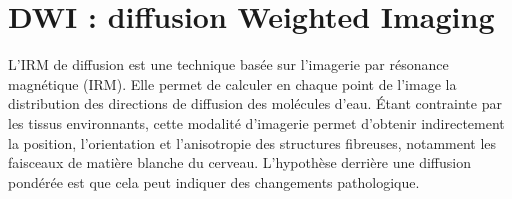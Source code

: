 \section{DWI : diffusion Weighted Imaging}

L’IRM de diffusion est une technique basée sur l'imagerie par résonance magnétique (IRM). Elle permet de calculer en chaque point de l'image la distribution des directions de diffusion des molécules d'eau. Étant contrainte par les tissus environnants, cette modalité d'imagerie permet d'obtenir indirectement la position, l'orientation et l'anisotropie des structures fibreuses, notamment les faisceaux de matière blanche du cerveau. L'hypothèse derrière une diffusion pondérée est que cela peut indiquer des changements pathologique.
